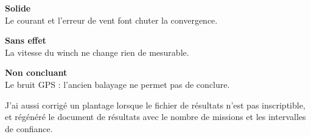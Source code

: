 \documentclass[11pt,a4paper]{article}
\begin{document}
\begin{center}
\begin{minipage}{0.48\linewidth}
\end{minipage}\hfill
\begin{minipage}{0.48\linewidth}
\end{minipage}
\end{center}

\noindent
\begin{minipage}[t]{0.32\linewidth}
\begin{ok}\sffamily\small\textbf{Solide}\\Le courant et l'erreur de vent font chuter la convergence.\end{ok}
\end{minipage}\hfill
\begin{minipage}[t]{0.32\linewidth}
\begin{info}\sffamily\small\textbf{Sans effet}\\La vitesse du winch ne change rien de mesurable.\end{info}
\end{minipage}\hfill
\begin{minipage}[t]{0.32\linewidth}
\begin{caution}\sffamily\small\textbf{Non concluant}\\Le bruit GPS : l'ancien balayage ne permet pas de conclure.\end{caution}
\end{minipage}

J'ai aussi corrigé un plantage lorsque le fichier de résultats n'est pas inscriptible, et régénéré le document de résultats
avec le nombre de missions et les intervalles de confiance.
\end{document}
